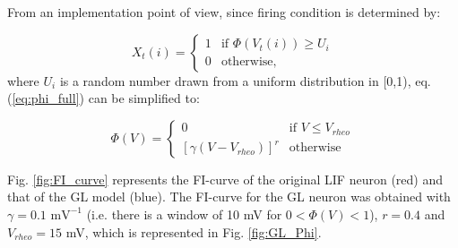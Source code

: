 \documentclass[11pt]{scrartcl}
\begin{document}
From an implementation point of view, since firing condition is determined by:

\begin{equation}
    X_t(i) = \begin{cases}
    1 & \text{if $\Phi(V_t(i)) \geq U_i$}\\
    0 & \text{otherwise},
    \end{cases}
\end{equation}
where \(U_i\) is a random number drawn from a uniform distribution in [0,1), eq. (\ref{eq:phi_full}) can be simplified to:


\begin{equation}
\Phi(V) = \begin{cases}
0 & \text{if $V \leq V_{rheo}$}\\
[\gamma(V-V_{rheo})]^r & \text{otherwise}
\end{cases}
\label{eq:phi}
\end{equation}

Fig. \ref{fig:FI_curve} represents the FI-curve of the original LIF neuron (red) and that of the GL model (blue). The FI-curve for the GL neuron was obtained with \(\gamma=0.1 \text{ mV}^{-1}\) (i.e. there is a window of 10 mV for \(0 < \Phi(V) < 1\)), \(r=0.4\) and \(V_{rheo}=15\) mV, which is represented in Fig. \ref{fig:GL_Phi}.
\end{document}
